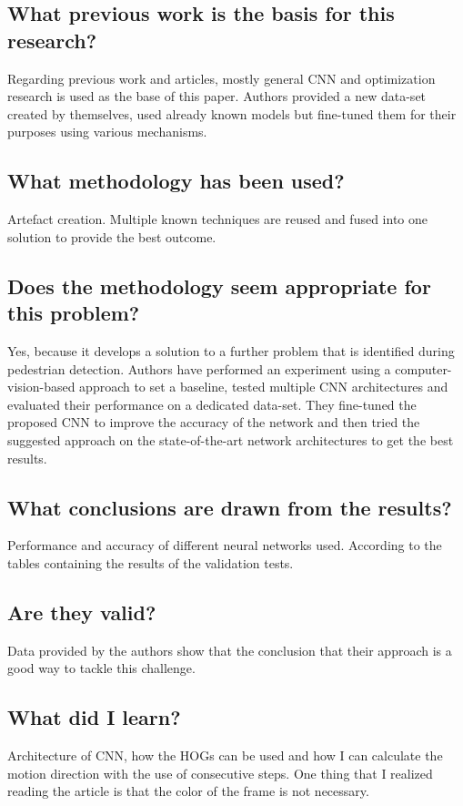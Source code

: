 \documentclass[11pt,a4paper]{article}
\begin{document}
\subsection*{What previous work is the basis for this research?}
Regarding previous work and articles, mostly general CNN and optimization research is used as the base of this paper. Authors provided a new data-set created by themselves, used already known models but fine-tuned them for their purposes using various mechanisms.

\subsection*{What methodology has been used?}
Artefact creation. Multiple known techniques are reused and fused into one solution to provide the best outcome.

\subsection*{Does the methodology seem appropriate for this problem?}
Yes, because it develops a solution to a further problem that is identified during pedestrian detection. Authors have performed an experiment using a computer-vision-based approach to set a baseline, tested multiple CNN architectures and evaluated their performance on a dedicated data-set. They fine-tuned the proposed CNN to improve the accuracy of the network and then tried the suggested approach on the state-of-the-art network architectures to get the best results.

\subsection*{What conclusions are drawn from the results?}
Performance and accuracy of different neural networks used. According to the tables containing the results of the validation tests.

\subsection*{Are they valid?}
Data provided by the authors show that the conclusion that their approach is a good way to tackle this challenge.

\subsection*{What did I learn?}
Architecture of CNN, how the HOGs can be used and how I can calculate the motion direction with the use of consecutive steps. One thing that I realized reading the article is that the color of the frame is not necessary.
\end{document}
